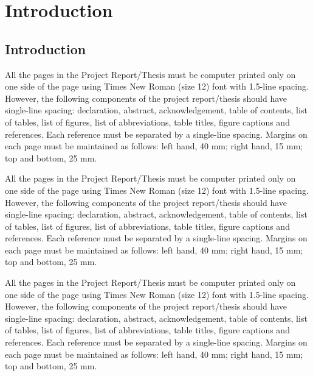 \chapter{Introduction}  %



\section{Introduction} %

 

 

All the pages in the Project Report/Thesis must be computer printed only on one side of the page using
Times New Roman (size 12) font with 1.5-line spacing.
However, the following components of the project report/thesis should have single-line spacing: declaration, abstract, acknowledgement, table of contents, list of tables, list of figures, list of abbreviations, table titles, figure captions and references. 
Each reference must be separated by a single-line spacing. Margins on each page must be maintained as
follows: left hand, 40 mm; right hand, 15 mm; top and bottom, 25 mm.  

All the pages in the Project Report/Thesis must be computer printed only on one side of the page using
Times New Roman (size 12) font with 1.5-line spacing.
However, the following components of the project report/thesis should have single-line spacing: declaration, abstract, acknowledgement, table of contents, list of tables, list of figures, list of abbreviations, table titles, figure captions and references. 
Each reference must be separated by a single-line spacing. Margins on each page must be maintained as
follows: left hand, 40 mm; right hand, 15 mm; top and bottom, 25 mm.  

All the pages in the Project Report/Thesis must be computer printed only on one side of the page using
Times New Roman (size 12) font with 1.5-line spacing.
However, the following components of the project report/thesis should have single-line spacing: declaration, abstract, acknowledgement, table of contents, list of tables, list of figures, list of abbreviations, table titles, figure captions and references. 
Each reference must be separated by a single-line spacing. Margins on each page must be maintained as
follows: left hand, 40 mm; right hand, 15 mm; top and bottom, 25 mm.  

